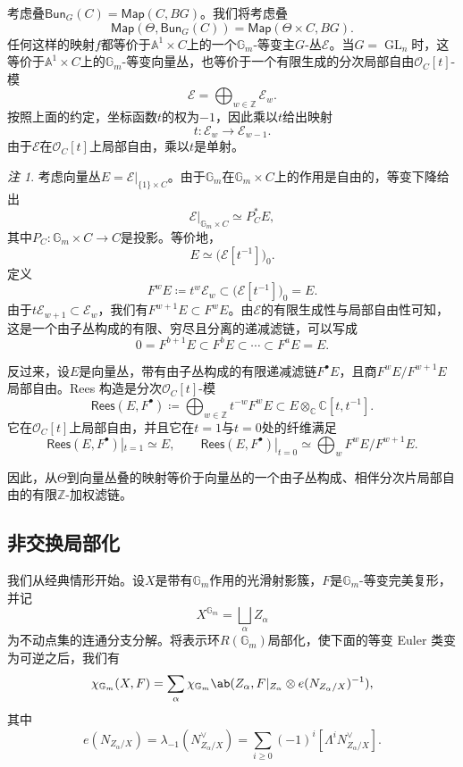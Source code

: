 \documentclass{amsart}
\theoremstyle{definition}
\theoremstyle{remark}
\newtheorem{rmk}[thm]{注}
\theoremstyle{plain}
\theoremstyle{definition}
\theoremstyle{remark}
\newcommand{\A}{\mathbb{A}}
\newcommand{\G}{\mathbb{G}}
\newcommand{\C}{\mathbb{C}}
\newcommand{\Z}{\mathbb{Z}}
\newcommand{\mc}[1]{\mathcal{#1}}
\newcommand{\on}[1]{\operatorname{#1}}
\newcommand{\ms}[1]{\mathsf{#1}}
\newcommand{\1}{\mathbf{1}}
\newcommand{\2}{\mathbf{2}}
\newcommand{\3}{\mathbf{3}}
\begin{document}
考虑叠\(\ms{Bun}_G(C) = \ms{Map}(C, BG)\)。我们将考虑叠
\[ \ms{Map}(\Theta, \ms{Bun}_G(C)) = \ms{Map}(\Theta \times C, BG). \]
任何这样的映射\(f\)都等价于\(\A^1\times C\)上的一个\(\G_m\)-等变主\(G\)-丛\(\mc{E}\)。当\(G=\on{GL}_n\)时，这等价于\(\A^1\times C\)上的\(\G_m\)-等变向量丛，也等价于一个有限生成的分次局部自由\(\mc{O}_C[t]\)-模
\[
    \mc{E}=\bigoplus_{w\in\Z}\mc{E}_w.
\]
按照上面的约定，坐标函数\(t\)的权为\(-1\)，因此乘以\(t\)给出映射
\[
    t\colon\mc{E}_w\longrightarrow\mc{E}_{w-1}.
\]
由于\(\mc{E}\)在\(\mc{O}_C[t]\)上局部自由，乘以\(t\)是单射。

\begin{rmk}
    考虑向量丛\(E=\mc{E}|_{\{1\}\times C}\)。由于\(\G_m\)在\(\G_m\times C\)上的作用是自由的，等变下降给出
    \[
        \mc{E}|_{\G_m\times C}\simeq P_C^*E,
    \]
    其中\(P_C\colon\G_m\times C\to C\)是投影。等价地，
    \[
        E\simeq\big(\mc{E}[t^{-1}]\big)_0.
    \]
    定义
    \[
        F^wE\coloneqq t^w\mc{E}_w\subset\big(\mc{E}[t^{-1}]\big)_0=E.
    \]
    由于\(t\mc{E}_{w+1}\subset\mc{E}_w\)，我们有\(F^{w+1}E\subset F^wE\)。由\(\mc{E}\)的有限生成性与局部自由性可知，这是一个由子丛构成的有限、穷尽且分离的递减滤链，可以写成
    \[
        0=F^{b+1}E\subset F^bE\subset\cdots\subset F^aE=E.
    \]

    反过来，设\(E\)是向量丛，带有由子丛构成的有限递减滤链\(F^\bullet E\)，且商\(F^wE/F^{w+1}E\)局部自由。Rees 构造是分次\(\mc{O}_C[t]\)-模
    \[
        \ms{Rees}(E,F^\bullet)
        \coloneqq
        \bigoplus_{w\in\Z}t^{-w}F^wE
        \subset
        E\otimes_{\C}\C[t,t^{-1}].
    \]
    它在\(\mc{O}_C[t]\)上局部自由，并且它在\(t=1\)与\(t=0\)处的纤维满足
    \[
        \ms{Rees}(E,F^\bullet)|_{t=1}\simeq E,
        \qquad
        \ms{Rees}(E,F^\bullet)|_{t=0}
        \simeq
        \bigoplus_w F^wE/F^{w+1}E.
    \]
\end{rmk}

因此，从\(\Theta\)到向量丛叠的映射等价于向量丛的一个由子丛构成、相伴分次片局部自由的有限\(\Z\)-加权滤链。


\subsection{非交换局部化}%
\label{sub:Non-abelian localization}

我们从经典情形开始。设\(X\)是带有\(\G_m\)作用的光滑射影簇，\(F\)是\(\G_m\)-等变完美复形，并记
\[
    X^{\G_m}=\bigsqcup_\alpha Z_\alpha
\]
为不动点集的连通分支分解。将表示环\(R(\G_m)\)局部化，使下面的等变 Euler 类变为可逆之后，我们有
\[
    \chi_{\G_m}(X,F)
    =
    \sum_\alpha
    \chi_{\G_m}\ab(
        Z_\alpha,
        F|_{Z_\alpha}\otimes e(N_{Z_\alpha/X})^{-1}
    ),
\]
其中
\[
    e(N_{Z_\alpha/X})
    =
    \lambda_{-1}(N_{Z_\alpha/X}^\vee)
    =
    \sum_{i\geq0}(-1)^i[\Lambda^iN_{Z_\alpha/X}^\vee].
\]
\end{document}
